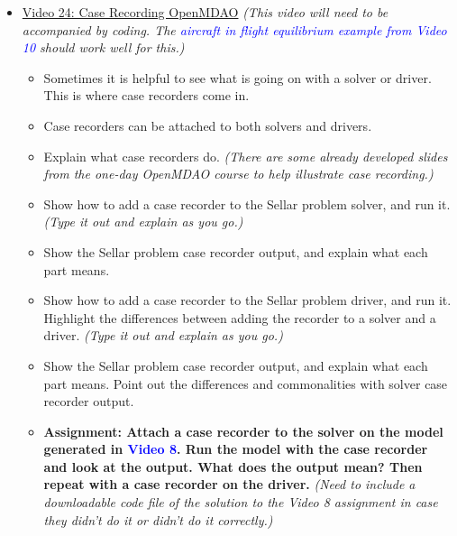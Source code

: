 \documentclass[12pt, letterpaper]{article}
\begin{document}
\begin{itemize}
	\item \underline{Video 24: Case Recording OpenMDAO} \textit{(This video will need to be accompanied by coding. The \textcolor{blue}{aircraft in flight equilibrium example from Video 10} should work well for this.)}
		\begin{itemize}
			\item Sometimes it is helpful to see what is going on with a solver or driver. This is where case recorders come in.
			\item Case recorders can be attached to both solvers and drivers.
			\item Explain what case recorders do. \textit{(There are some already developed slides from the one-day OpenMDAO course to help illustrate case recording.)}
			\item Show how to add a case recorder to the Sellar problem solver, and run it. \textit{(Type it out and explain as you go.)}
			\item Show the Sellar problem case recorder output, and explain what each part means.
			\item Show how to add a case recorder to the Sellar problem driver, and run it. Highlight the differences between adding the recorder to a solver and a driver. \textit{(Type it out and explain as you go.)}
			\item Show the Sellar problem case recorder output, and explain what each part means. Point out the differences and commonalities with solver case recorder output.
			\item \textbf{Assignment: Attach a case recorder to the solver on the model generated in \textcolor{blue}{Video 8}. Run the model with the case recorder and look at the output. What does the output mean? Then repeat with a case recorder on the driver.} \textit{(Need to include a downloadable code file of the solution to the Video 8 assignment in case they didn't do it or didn't do it correctly.)}
		\end{itemize}
		

\end{itemize}
\end{document}
